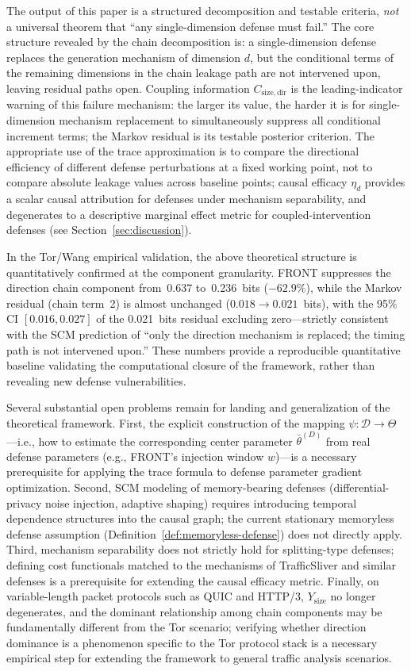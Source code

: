 \documentclass[lettersize,journal]{IEEEtran}
\begin{document}
The output of this paper is a structured decomposition and testable
criteria, \emph{not} a universal theorem that ``any single-dimension
defense must fail.''
The core structure revealed by the chain decomposition is: a
single-dimension defense replaces the generation mechanism of dimension $d$,
but the conditional terms of the remaining dimensions in the chain leakage
path are not intervened upon, leaving residual paths open.
Coupling information $C_{\mathrm{size,dir}}$ is the leading-indicator
warning of this failure mechanism: the larger its value, the harder it is
for single-dimension mechanism replacement to simultaneously suppress all
conditional increment terms; the Markov residual is its testable
posterior criterion.
The appropriate use of the trace approximation is to compare the
directional efficiency of different defense perturbations at a fixed working
point, not to compare absolute leakage values across baseline points;
causal efficacy $\eta_d$ provides a scalar causal attribution for defenses
under mechanism separability, and degenerates to a descriptive marginal
effect metric for coupled-intervention defenses
(see Section~\ref{sec:discussion}).

In the Tor/Wang empirical validation, the above theoretical structure is
quantitatively confirmed at the component granularity.
FRONT suppresses the direction chain component from~0.637 to~0.236~bits
($-62.9\%$), while the Markov residual (chain term~2) is almost unchanged
($0.018\to 0.021$~bits), with the 95\% CI $[0.016,0.027]$ of the
0.021~bits residual excluding zero---strictly consistent with the SCM
prediction of ``only the direction mechanism is replaced; the timing path
is not intervened upon.''
These numbers provide a reproducible quantitative baseline validating the
computational closure of the framework, rather than revealing new defense
vulnerabilities.

Several substantial open problems remain for landing and generalization of
the theoretical framework.
First, the explicit construction of the mapping $\psi:\mathcal{D}\to\Theta$
---i.e., how to estimate the corresponding center parameter
$\bar\theta^{(D)}$ from real defense parameters (e.g., FRONT's injection
window $w$)---is a necessary prerequisite for applying the trace formula to
defense parameter gradient optimization.
Second, SCM modeling of memory-bearing defenses (differential-privacy
noise injection, adaptive shaping) requires introducing temporal dependence
structures into the causal graph; the current stationary memoryless defense
assumption (Definition~\ref{def:memoryless-defense}) does not directly apply.
Third, mechanism separability does not strictly hold for splitting-type
defenses; defining cost functionals matched to the mechanisms of TrafficSliver
and similar defenses is a prerequisite for extending the causal efficacy
metric.
Finally, on variable-length packet protocols such as QUIC and HTTP/3,
$Y_{\mathrm{size}}$ no longer degenerates, and the dominant relationship
among chain components may be fundamentally different from the Tor scenario;
verifying whether direction dominance is a phenomenon specific to the Tor
protocol stack is a necessary empirical step for extending the framework
to general traffic analysis scenarios.
\end{document}
